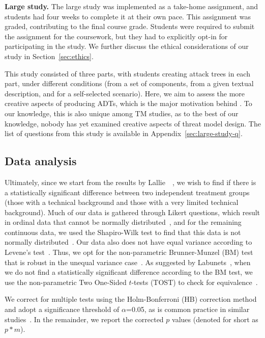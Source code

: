 \textbf{Large study.}
The large study was implemented as a take-home assignment, and students had four weeks to complete it at their own pace. This assignment was graded, contributing to the final course grade. Students were required to submit the assignment for the coursework, but they had to explicitly opt-in for participating in the study. We further discuss the ethical considerations of our study in Section~\ref{sec:ethics}.

This study consisted of three parts, with students creating attack trees in each part, under different conditions (from a set of components, from a given textual description, and for a self-selected scenario). Here, we aim to assess the more creative aspects of producing ADTs, which is the major motivation behind . To our knowledge, this is also unique among TM studies, as to the best of our knowledge, nobody has yet examined creative aspects of threat model design. The list of questions from this study is available in Appendix~\ref{sec:large-study-q}.



\subsection{Data analysis}
\label{ssec:data-analysis}

Ultimately, since we start from the results by Lallie~\etal~\cite{lallieEmpiricalEvaluationEffectiveness2017}, we wish to find if there is a statistically significant difference between two independent treatment groups (those with a technical background and those with a very limited technical background). Much of our data is gathered through Likert questions, which result in ordinal data that cannot be normally distributed~\cite{verhulst2021best}, and for the remaining continuous data, we used the Shapiro-Wilk test to find that this data is not normally distributed~\cite{hanusz2016shapiro}. Our data also does not have equal variance according to Levene's test~\cite{levene1960robust}. Thus, we opt for the non-parametric Brunner-Munzel (BM) test~\cite{brunner2000nonparametric} that is robust in the unequal variance case~\cite{karch2021psychologists,fagerland2009wilcoxon}. As suggested by Labunets~\cite{labunets_no_2018}, when we do not find a statistically significant difference according to the BM test, we use the non-parametric Two One-Sided $t$-tests (TOST) to check for equivalence~\cite{schuirmann1981hypothesis}.

We correct for multiple tests using the Holm-Bonferroni (HB) correction method~\cite{holm1979simple} and adopt a significance threshold of $\alpha$=0.05, as is common practice in similar studies~\cite{labunets_no_2018,broccia_assessing_2024}.  In the remainder, we report the corrected $p$ values (denoted for short as $p * m$).  


